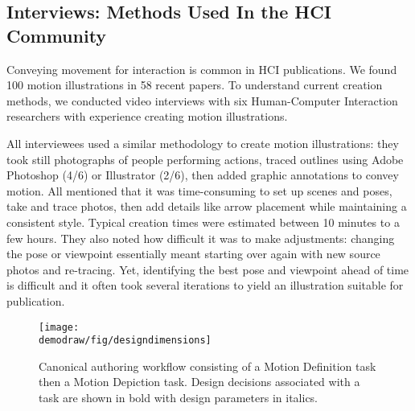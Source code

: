 \subsection{Interviews: Methods Used In the HCI Community}
Conveying movement for interaction is common in HCI publications. We found 100 motion illustrations in 58 recent papers.
%
To understand current creation methods, we conducted video interviews with six Human-Computer Interaction researchers with experience creating motion illustrations.

%
All interviewees used a similar methodology to create motion illustrations: they took still photographs of people performing actions, traced outlines using Adobe Photoshop (4/6) or Illustrator (2/6), then added graphic annotations to convey motion. %
%
All mentioned that it was time-consuming to set up scenes and poses, take and trace photos, then add details like arrow placement while maintaining a consistent style. Typical creation times were estimated between 10 minutes to a few hours.
They also noted how difficult it was to make adjustments: changing the pose or viewpoint essentially meant starting over again with new source photos and re-tracing.
Yet, identifying the best pose and viewpoint ahead of time is difficult and it often took several iterations to yield an illustration suitable for publication.

\begin{figure}[t]
  \centering
  \texttt{[image: \\demodraw/fig/designdimensions]}
  \caption{Canonical authoring workflow consisting of a Motion Definition task then a Motion Depiction task. Design decisions associated with a task are shown in bold with design parameters in italics.}
  \label{fig:designspace}
\end{figure}

